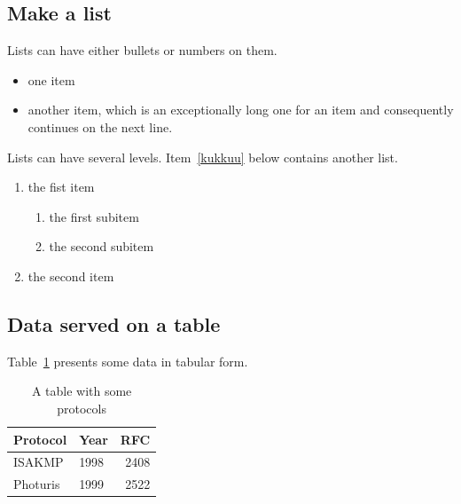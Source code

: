\documentclass[a4paper,12pt]{article}
\begin{document}

\subsection{Make a list}\label{sec:list}

Lists can have either bullets or numbers on them. 

\begin{itemize}
\item one item
\item another item, which is an exceptionally long one for an item
  and consequently continues on the next line.
\end{itemize}

Lists can have several levels. Item~\ref{kukkuu} below contains
another list.
\begin{enumerate}
\item the fist item \label{kukkuu}
  \begin{enumerate}
  \item the first subitem 
  \item the second subitem
  \end{enumerate}
\item the second item
\end{enumerate}


\subsection{Data served on a table}

Table~\ref{tab:mytable1} presents some data in tabular form. 

\begin{table}[t]
  \begin{center}
    \begin{tabular}{|l|lr|}
    \hline
    Protocol & Year &  RFC \\
    \hline
    ISAKMP   & 1998 & 2408 \\
    Photuris & 1999 & 2522 \\
    \hline
    \end{tabular}
    \caption{A table with some protocols}
    \label{tab:mytable1}
  \end{center}
\end{table}

\end{document}
